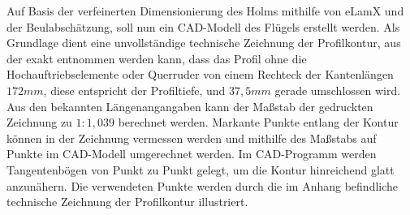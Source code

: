 Auf Basis der verfeinerten Dimensionierung des Holms mithilfe von eLamX und der Beulabschätzung, soll nun ein CAD-Modell des Flügels erstellt werden. Als Grundlage dient eine unvollständige technische Zeichnung der Profilkontur, aus der exakt entnommen werden kann, dass das Profil ohne die Hochauftriebselemente oder Querruder von einem Rechteck der Kantenlängen $ 172mm $, diese entspricht der Profiltiefe, und $ 37,5mm $ gerade umschlossen wird. Aus den bekannten Längenangangaben kann der Maßstab der gedruckten Zeichnung zu $ 1:1,039 $ berechnet werden. Markante Punkte entlang der Kontur können in der Zeichnung vermessen werden und mithilfe des Maßstabs auf Punkte im CAD-Modell umgerechnet werden. Im CAD-Programm werden Tangentenbögen von Punkt zu Punkt gelegt, um die Kontur hinreichend glatt anzunähern. Die verwendeten Punkte werden durch die im Anhang befindliche technische Zeichnung der Profilkontur illustriert.\\

